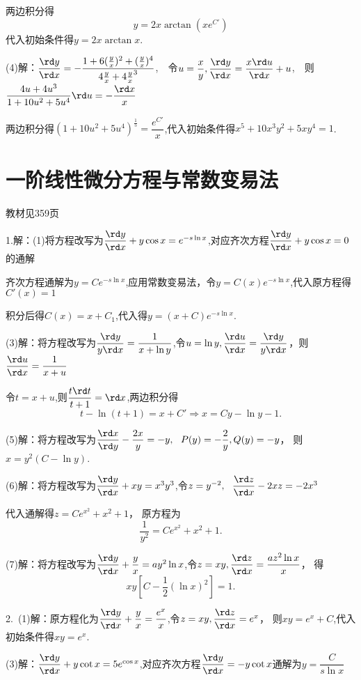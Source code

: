   两边积分得
  \[y=2x \arctan(xe^{C'})\]
  代入初始条件得$y=2x\arctan x$.

  (4)解：$\dfrac{\rd y}{\rd x}=-\dfrac{1+6(\frac{y}{x})^2+(\frac{y}{x})^4}{4\frac{y}{x}+4\frac{y}{x}^3}$,~~令$u=\dfrac{x}{y},\dfrac{\rd y}{\rd x}=\dfrac{x\rd u}{\rd x}+u$,~~则$\dfrac{4u+4u^3}{1+10u^2+5u^4}\rd u=-\dfrac{\rd x}{x}$

  两边积分得$(1+10u^2+5u^4)^{\frac{1}{5}}=\dfrac{e^{C'}}{x}$,代入初始条件得$x^5+10x^3y^2+5xy^4=1$.


\section{一阶线性微分方程与常数变易法}
\begin{flushright}
  \color{zhanqing!80}
   教材见359页
\end{flushright}
  1.解：(1)将方程改写为$\dfrac{\rd y}{\rd x}+y \cos x=e^{-s \ln x}$,对应齐次方程$\dfrac{\rd y}{\rd x}+y \cos x=0$的通解

  齐次方程通解为$y=Ce^{-s \ln x}$,应用常数变易法，令$y=C(x)e^{-s \ln x}$,代入原方程得$C'(x)=1$

  积分后得$C(x)=x+C_1$,代入得$y=(x+C)e^{-s \ln x}$.

  (3)解：将方程改写为$\dfrac{\rd y}{y\rd x}=\dfrac{1}{x+ \ln y}$,令$u= \ln y,\dfrac{\rd u}{\rd x}=\dfrac{\rd y}{y\rd x}  $，则$\dfrac{\rd u}{\rd x}=\dfrac{1}{x+u}$

  令$t=x+u$,则$\dfrac{t\rd t}{t+1}=\rd x$,两边积分得
  $$t- \ln (t+1)=x+C' \Rightarrow x=Cy- \ln y-1.$$

  (5)解：将方程改写为$\dfrac{\rd x}{\rd y}-\dfrac{2x}{y}=-y,~~P(y)=-\dfrac{2}{y},Q(y)=-y$，
  则$x=y^2(C- \ln y)$.

  (6)解：将方程改写为$\dfrac{\rd y}{\rd x}+xy=x^3y^3$,令$z=y^{-2},~~\dfrac{\rd z}{\rd x}-2xz=-2x^3$

  代入通解得$z=Ce^{x^2}+x^2+1$，
  原方程为
  $$\dfrac{1}{y^2}=Ce^{x^2}+x^2+1.$$

  (7)解：将方程改写为$\dfrac{\rd y}{\rd x}+\dfrac{y}{x}=ay^2 \ln x$,令$z=xy,\dfrac{\rd z}{\rd x}=\dfrac{az^2 \ln x}{x}$，
  得
  $$xy\left[C-\dfrac{1}{2}( \ln x)^2\right]=1.$$

  2.~(1)解：原方程化为$\dfrac{\rd y}{\rd x}+\dfrac{y}{x}=\dfrac{e^x}{x}$,令$z=xy,\dfrac{\rd z}{\rd x}=e^x$，
  则$xy=e^x+C$,代入初始条件得$xy=e^x$.

  (3)解：$\dfrac{\rd y}{\rd x}+y \cot x=5e^{ \cos x}$,对应齐次方程$\dfrac{\rd y}{\rd x}=-y\cot x$通解为$y=\dfrac{C}{s \ln x}$

